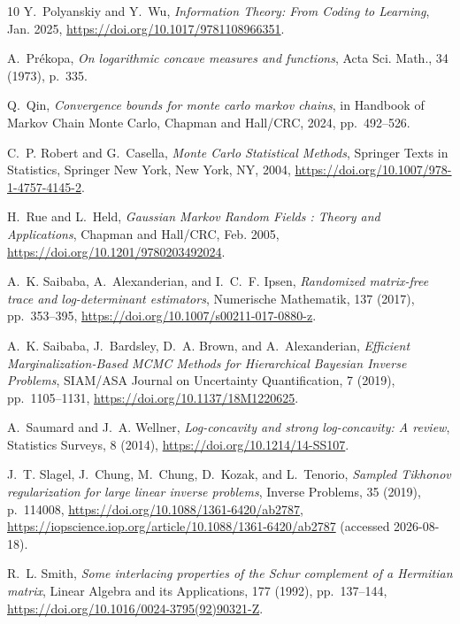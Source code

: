 \documentclass[onefignum,onetabnum]{siamonline250211}
\begin{document}
\begin{thebibliography}{10}
{\sc Y.~Polyanskiy and Y.~Wu}, {\em Information {Theory}: {From} {Coding} to
  {Learning}}, Jan. 2025, \url{https://doi.org/10.1017/9781108966351}.

{\sc A.~Prékopa}, {\em On logarithmic concave measures and functions}, Acta
  Sci. Math., 34 (1973), p.~335.

{\sc Q.~Qin}, {\em Convergence bounds for monte carlo markov chains}, in
  Handbook of {Markov} {Chain} {Monte} {Carlo}, Chapman and Hall/CRC, 2024,
  pp.~492--526.

{\sc C.~P. Robert and G.~Casella}, {\em Monte {Carlo} {Statistical} {Methods}},
  Springer {Texts} in {Statistics}, Springer New York, New York, NY, 2004,
  \url{https://doi.org/10.1007/978-1-4757-4145-2}.

{\sc H.~Rue and L.~Held}, {\em Gaussian {Markov} {Random} {Fields} : {Theory}
  and {Applications}}, Chapman and Hall/CRC, Feb. 2005,
  \url{https://doi.org/10.1201/9780203492024}.

{\sc A.~K. Saibaba, A.~Alexanderian, and I.~C.~F. Ipsen}, {\em Randomized
  matrix-free trace and log-determinant estimators}, Numerische Mathematik, 137
  (2017), pp.~353--395, \url{https://doi.org/10.1007/s00211-017-0880-z}.

{\sc A.~K. Saibaba, J.~Bardsley, D.~A. Brown, and A.~Alexanderian}, {\em
  Efficient {Marginalization}-{Based} {MCMC} {Methods} for {Hierarchical}
  {Bayesian} {Inverse} {Problems}}, SIAM/ASA Journal on Uncertainty
  Quantification, 7 (2019), pp.~1105--1131,
  \url{https://doi.org/10.1137/18M1220625}.

{\sc A.~Saumard and J.~A. Wellner}, {\em Log-concavity and strong
  log-concavity: {A} review}, Statistics Surveys, 8 (2014),
  \url{https://doi.org/10.1214/14-SS107}.

{\sc J.~T. Slagel, J.~Chung, M.~Chung, D.~Kozak, and L.~Tenorio}, {\em Sampled
  {Tikhonov} regularization for large linear inverse problems}, Inverse
  Problems, 35 (2019), p.~114008,
  \url{https://doi.org/10.1088/1361-6420/ab2787},
  \url{https://iopscience.iop.org/article/10.1088/1361-6420/ab2787} (accessed
  2026-08-18).

{\sc R.~L. Smith}, {\em Some interlacing properties of the {Schur} complement
  of a {Hermitian} matrix}, Linear Algebra and its Applications, 177 (1992),
  pp.~137--144, \url{https://doi.org/10.1016/0024-3795(92)90321-Z}.


\end{thebibliography}
\end{document}
